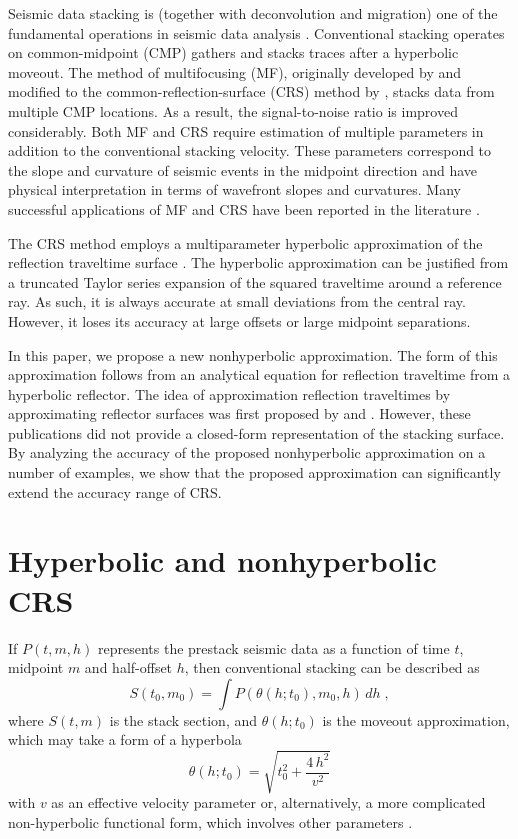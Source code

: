 Seismic data stacking is (together with deconvolution and migration)
one of the fundamental operations in seismic data analysis
\cite[]{yilmaz}. Conventional stacking operates on com\-mon-midpoint
(CMP) gathers and stacks traces after a hyperbolic moveout. The method
of multifocusing (MF), originally developed by
\cite{gelchinsky,gelchinsky2} and modified to the
common-reflection-surface (CRS) method by \cite{jager},
stacks data from multiple CMP locations. As a result, the
signal-to-noise ratio is improved considerably. Both MF and CRS
require estimation of multiple parameters in addition to the
conventional stacking velocity. These parameters correspond to the
slope and curvature of seismic events in the midpoint direction and
have physical interpretation in terms of wavefront slopes and
curvatures. Many successful applications of MF and CRS have been
reported in the literature
\cite[]{landa,GEO67-02-06390643,basin,topography,saudi,interp}.

The CRS method employs a multiparameter hyperbolic approximation of
the reflection traveltime surface \cite[]{tygel}. The hyperbolic
approximation can be justified from a truncated Taylor series
expansion of the squared traveltime around a reference ray. As such,
it is always accurate at small deviations from the central ray.
However, it loses its accuracy at large offsets or large midpoint
separations.

In this paper, we propose a new nonhyperbolic approximation. The form
of this approximation follows from an analytical equation for
reflection traveltime from a hyperbolic reflector.  The idea of
approximation reflection traveltimes by approximating reflector
surfaces was first proposed by \cite{revisited} and
\cite{sigma}. However, these publications did not
provide a closed-form representation of the stacking surface. By
analyzing the accuracy of the proposed nonhyperbolic approximation on
a number of examples, we show that the proposed approximation can
significantly extend the accuracy range of CRS.

\section{Hyperbolic and nonhyperbolic CRS}

If $P(t,m,h)$ represents the prestack seismic data as a function of
time $t$, midpoint $m$ and half-offset $h$, then conventional stacking
can be described as
\begin{equation}
\label{eq:stack}
S(t_0,m_0) = \int P\left(\theta(h;t_0),m_0,h\right)\,d h\;,
\end{equation}
where $S(t,m)$ is the stack section, and $\theta(h;t_0)$ is the
moveout approximation, which may take a form of a hyperbola
\begin{equation}
\label{eq:hyper}
\theta(h;t_0) = \sqrt{t_0^2 + \frac{4\,h^2}{v^2}}
\end{equation}
with $v$ as an effective velocity parameter or, alternatively, a more
complicated non-hyperbolic functional form, which involves other
parameters \cite[]{hyper}.

